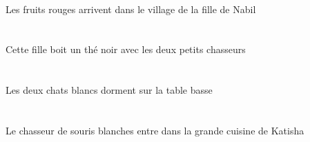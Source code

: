 \begin{exe}
\DEFPlAbsG{}   \rougeBPlG{}   \fruitBPlAbsG{}    \DEFSgOblG{}    \DEFSgOblG{}    \INDSgOblG{}   \NabilBSgOblG{}   \DEG{}   \filleCSgOblG{}   \DEG{}   \villageASgOblG{}   \DANSG{}  \arriverViPrsBPlG{}\\
Les fruits rouges arrivent dans le village de la fille de Nabil
\ex\glll
\DEFDuObl{}   \petitCDu{}   \chasseurCDuObl{}   \AVEC{}   \DEMSgErg{}   \filleCSgErg{}   \INDSgAbs{}   \noirBSg{}   \theBSgAbs{}  \boireVtPrsBSg{}\\
\DEFDuOblP{}   \petitCDuP{}   \chasseurCDuOblP{}   \AVECP{}   \DEMSgErgP{}   \filleCSgErgP{}   \INDSgAbsP{}   \noirBSgP{}   \theBSgAbsP{}  \boireVtPrsBSgP{}\\
\DEFDuOblG{}   \petitCDuG{}   \chasseurCDuOblG{}   \AVECG{}   \DEMSgErgG{}   \filleCSgErgG{}   \INDSgAbsG{}   \noirBSgG{}   \theBSgAbsG{}  \boireVtPrsBSgG{}\\
Cette fille boit un thé noir avec les deux petits chasseurs
\ex\glll
\DEFDuAbs{}   \blancDDu{}   \chatDDuAbs{}    \DEFSgObl{}   \basCSg{}   \tableCSgObl{}   \SUR{}  \dormirViPrsDDu{}\\
\DEFDuAbsP{}   \blancDDuP{}   \chatDDuAbsP{}    \DEFSgOblP{}   \basCSgP{}   \tableCSgOblP{}   \SURP{}  \dormirViPrsDDuP{}\\
\DEFDuAbsG{}   \blancDDuG{}   \chatDDuAbsG{}    \DEFSgOblG{}   \basCSgG{}   \tableCSgOblG{}   \SURG{}  \dormirViPrsDDuG{}\\
Les deux chats blancs dorment sur la table basse
\ex\glll
\DEFSgAbs{}    \INDPlObl{}   \blancAPl{}   \sourisAPlObl{}   \DE{}   \chasseurCSgAbs{}    \DEFSgObl{}    \INDSgObl{}   \KatishaASgObl{}   \DE{}   \grandCSg{}   \cuisineCSgObl{}   \DANS{}  \entrerViPrsCSg{}\\
\DEFSgAbsP{}    \INDPlOblP{}   \blancAPlP{}   \sourisAPlOblP{}   \DEP{}   \chasseurCSgAbsP{}    \DEFSgOblP{}    \INDSgOblP{}   \KatishaASgOblP{}   \DEP{}   \grandCSgP{}   \cuisineCSgOblP{}   \DANSP{}  \entrerViPrsCSgP{}\\
\DEFSgAbsG{}    \INDPlOblG{}   \blancAPlG{}   \sourisAPlOblG{}   \DEG{}   \chasseurCSgAbsG{}    \DEFSgOblG{}    \INDSgOblG{}   \KatishaASgOblG{}   \DEG{}   \grandCSgG{}   \cuisineCSgOblG{}   \DANSG{}  \entrerViPrsCSgG{}\\
Le chasseur de souris blanches entre dans la grande cuisine de Katisha
\ex\glll
\DEFSgErg{}   \tableCSgErg{}   \INDPlAbs{}   \rougeBPl{}   \fruitBPlAbs{}  \supporterVtPrsBPl{}\\
\DEFSgErgP{}   \tableCSgErgP{}   \INDPlAbsP{}   \rougeBPlP{}   \fruitBPlAbsP{}  \supporterVtPrsBPlP{}\\

\end{exe}
